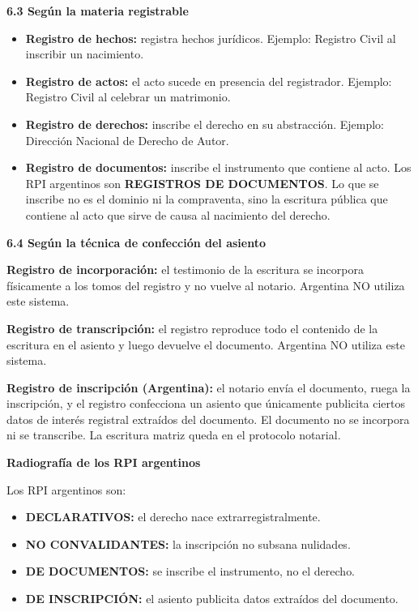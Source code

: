 \documentclass[11pt]{article}
\newcommand{\subheading}[1]{%
  \vspace{7pt}
  {\fontsize{12}{14}\selectfont\bfseries\color{navy}#1}\par
  \vspace{2pt}
}
\newenvironment{wordlist}
{\begin{itemize}[leftmargin=1.35em,itemsep=2pt,topsep=2pt,parsep=0pt]}
{\end{itemize}}
\begin{document}
\subheading{6.3 Según la materia registrable}

\begin{wordlist}
\item \textbf{Registro de hechos:} registra hechos jurídicos. Ejemplo: Registro Civil al inscribir un nacimiento.
\item \textbf{Registro de actos:} el acto sucede en presencia del registrador. Ejemplo: Registro Civil al celebrar un matrimonio.
\item \textbf{Registro de derechos:} inscribe el derecho en su abstracción. Ejemplo: Dirección Nacional de Derecho de Autor.
\item \textbf{Registro de documentos:} inscribe el instrumento que contiene al acto. Los RPI argentinos son \textbf{REGISTROS DE DOCUMENTOS}. Lo que se inscribe no es el dominio ni la compraventa, sino la escritura pública que contiene al acto que sirve de causa al nacimiento del derecho.
\end{wordlist}

\subheading{6.4 Según la técnica de confección del asiento}

\textbf{Registro de incorporación:} el testimonio de la escritura se incorpora físicamente a los tomos del registro y no vuelve al notario. Argentina NO utiliza este sistema.

\textbf{Registro de transcripción:} el registro reproduce todo el contenido de la escritura en el asiento y luego devuelve el documento. Argentina NO utiliza este sistema.

\textbf{Registro de inscripción (Argentina):} el notario envía el documento, ruega la inscripción, y el registro confecciona un asiento que únicamente publicita ciertos datos de interés registral extraídos del documento. El documento no se incorpora ni se transcribe. La escritura matriz queda en el protocolo notarial.

\subheading{Radiografía de los RPI argentinos}

Los RPI argentinos son:

\begin{wordlist}
\item \textbf{DECLARATIVOS:} el derecho nace extrarregistralmente.
\item \textbf{NO CONVALIDANTES:} la inscripción no subsana nulidades.
\item \textbf{DE DOCUMENTOS:} se inscribe el instrumento, no el derecho.
\item \textbf{DE INSCRIPCIÓN:} el asiento publicita datos extraídos del documento.
\end{wordlist}
\end{document}
